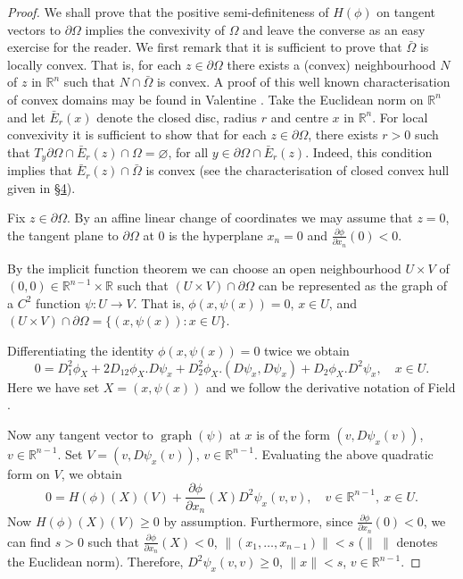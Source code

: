 \begin{proof}
We shall prove that the positive semi-definiteness of $H(\phi)$ on tangent vectors to $\partial\Omega$ implies the convexivity of $\Omega$ and leave the converse as an easy exercise for the reader. We first remark that it is sufficient to prove that $\bar\Omega$ is locally convex. That is, for each $z\in\partial\Omega$ there exists a (convex) neighbourhood $N$ of $z$ in $\mathbb R^n$ such that $N\cap\bar\Omega$ is convex. A proof of this well known characterisation of convex domains may be found in Valentine \cite{bib:I:valentine-f-a:1}. Take the Euclidean norm on $\mathbb R^n$ and let $\bar E_r(x)$ denote the closed disc, radius $r$ and centre $x$ in $\mathbb R^n$. For local convexivity it is sufficient to show that for each $z\in\partial\Omega$, there exists $r>0$ such that $T_y\partial\Omega\cap\bar E_r(z)\cap\Omega=\varnothing$, for all $y\in\partial\Omega\cap\bar E_r(z)$. Indeed, this condition implies that $\bar E_r(z)\cap\bar\Omega$ is convex (see the characterisation of closed convex hull given in \hyperref[sec:2:4]{\S4}).

Fix $z\in\partial\Omega$. By an affine linear change of coordinates we may assume that $z=0$, the tangent plane to $\partial\Omega$ at 0 is the hyperplane $x_n=0$ and $\frac{\partial\phi}{\partial x_n}(0)<0$.
\begin{center}
    \begin{minipage}{\linewidth}
        \centering
        
    \end{minipage}
\end{center}
By the implicit function theorem we can choose an open neighbourhood $U\times V$ of $(0,0)\in\mathbb R^{n-1}\times\mathbb R$ such that $(U\times V)\cap\partial\Omega$ can be represented as the graph of a $C^2$ function $\psi:U\to V$. That is, $\phi(x,\psi(x))=0$, $x\in U$, and $(U\times V)\cap\partial\Omega=\{(x,\psi(x)):x\in U\}$.

Differentiating the identity $\phi(x,\psi(x))=0$ twice we obtain
\[0=D_1^2\phi_X+2D_{12}\phi_X.D\psi_x+D_2^2\phi_X.(D\psi_x,D\psi_x)+D_2\phi_X.D^2\psi_x,\quad x\in U.\]
Here we have set $X=(x,\psi(x))$ and we follow the derivative notation of Field \cite{bib:I:field-m-j:1}.

Now any tangent vector to $\operatorname{graph}(\psi)$ at $x$ is of the form $(v,D\psi_x(v))$, $v\in\mathbb R^{n-1}$. Set $V=(v,D\psi_x(v))$, $v\in\mathbb R^{n-1}$. Evaluating the above quadratic form on $V$, we obtain
\[0=H(\phi)(X)(V)+\frac{\partial\phi}{\partial x_n}(X)D^2\psi_x(v,v),\quad v\in\mathbb R^{n-1},\ x\in U.\]
Now $H(\phi)(X)(V)\geq0$ by assumption. Furthermore, since $\frac{\partial\phi}{\partial x_n}(0)<0$, we can find $s>0$ such that $\frac{\partial\phi}{\partial x_n}(X)<0$, $\|(x_1,\ldots,x_{n-1})\|<s$ ($\|\ \|$ denotes the Euclidean norm). Therefore, $D^2\psi_x(v,v)\geq0$, $\|x\|<s$, $v\in\mathbb R^{n-1}$.


\end{proof}
